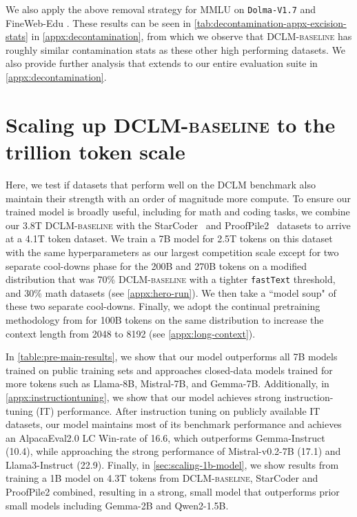 We also apply the above removal strategy for MMLU on \texttt{Dolma-V1.7} \citep{soldaini2024dolma} and FineWeb-Edu \citep{lozhkov2024fineweb-edu}. These results can be seen in \ref{tab:decontamination-appx-excision-stats} in \ref{appx:decontamination}, from which we observe that
\textsc{DCLM-baseline} has roughly similar contamination stats as these other high performing datasets. We also provide further analysis that extends to our entire evaluation suite in \ref{appx:decontamination}.

\section{Scaling up \textsc{DCLM-baseline} to the trillion token scale}
\label{sec:hero_run}

Here, we test if datasets that perform well on the \textsc{DCLM} benchmark also maintain their strength with an order of magnitude more compute. To ensure our trained model is broadly useful, including for math and coding tasks, we combine our 3.8T \textsc{DCLM-baseline} with the StarCoder~\citep{li2023starcoder} and ProofPile2~\citep{azerbayev2023llemma} datasets to arrive at a 4.1T token dataset. We train a 7B model for 2.5T tokens on this dataset with the same hyperparameters as our largest competition scale except for two separate cool-downs phase for the 200B and 270B tokens on a modified distribution that was 70\% \textsc{DCLM-baseline} with a tighter \texttt{fastText} threshold, and 30\% math datasets (see \ref{appx:hero-run}). We then take a ``model soup" of these two separate cool-downs\citep{wortsman2022model}. Finally, we adopt the continual pretraining methodology from \citet{pouransari2024dataset} for 100B tokens on the same distribution to increase the context length from 2048 to 8192 (see \ref{appx:long-context}).

In \ref{table:pre-main-results}, we show that our model outperforms all 7B models trained on public training sets and approaches closed-data models trained for more tokens such as Llama-8B, Mistral-7B, and Gemma-7B. Additionally, in \ref{appx:instructiontuning}, we show that our model achieves strong instruction-tuning (IT) performance. After instruction tuning on publicly available IT datasets, our model maintains most of its benchmark performance and achieves an AlpacaEval2.0 LC Win-rate of 16.6, which outperforms Gemma-Instruct (10.4), while approaching the strong performance of  Mistral-v0.2-7B (17.1) and Llama3-Instruct (22.9). Finally, in \ref{sec:scaling-1b-model}, we show results from training a 1B model on 4.3T tokens from \textsc{DCLM-baseline}, StarCoder and ProofPile2 combined, resulting in a strong, small model that outperforms prior small models including Gemma-2B and Qwen2-1.5B.


